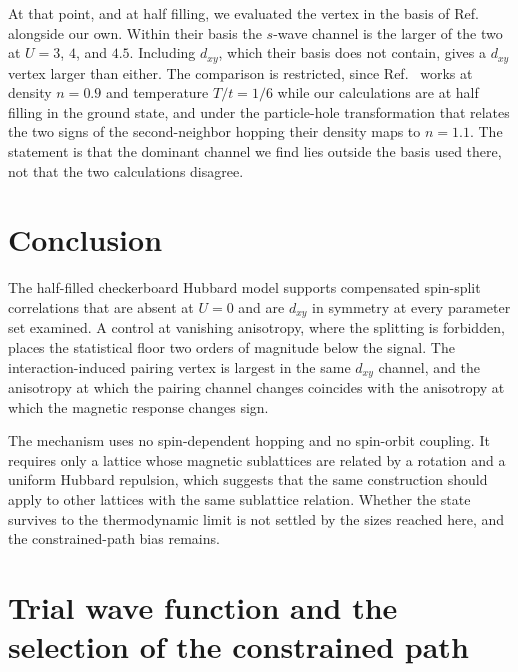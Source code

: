 \documentclass[aps,prb,reprint,superscriptaddress,amsmath,amssymb,floatfix]{revtex4-2}
\begin{document}
At that point, and at half filling, we evaluated the vertex in the basis of
Ref.~\cite{Pan2024} alongside our own. Within their basis the $s$-wave channel is
the larger of the two at $U = 3$, $4$, and $4.5$. Including $d_{xy}$, which their
basis does not contain, gives a $d_{xy}$ vertex larger than either.
The comparison is restricted, since Ref.~\cite{Pan2024} works at density
$n = 0.9$ and temperature $T/t = 1/6$ while our calculations are at half filling
in the ground state, and under the particle-hole transformation that relates the
two signs of the second-neighbor hopping their density maps to $n = 1.1$. The
statement is that the dominant channel we find lies outside the basis used there,
not that the two calculations disagree.

\section{Conclusion}

The half-filled checkerboard Hubbard model supports compensated spin-split
correlations that are absent at $U = 0$ and are $d_{xy}$ in symmetry at every
parameter set examined. A control at vanishing anisotropy, where the splitting is
forbidden, places the statistical floor two orders of magnitude below the signal.
The interaction-induced pairing vertex is largest in the same $d_{xy}$ channel,
and the anisotropy at which the pairing channel changes coincides with the
anisotropy at which the magnetic response changes sign.

The mechanism uses no spin-dependent hopping and no spin-orbit coupling. It
requires only a lattice whose magnetic sublattices are related by a rotation and a
uniform Hubbard repulsion, which suggests that the same construction should apply
to other lattices with the same sublattice relation. Whether the state survives to
the thermodynamic limit is not settled by the sizes reached here, and the
constrained-path bias remains.

\appendix

\section{Trial wave function and the selection of the constrained path}
\label{app:trial}
\end{document}
